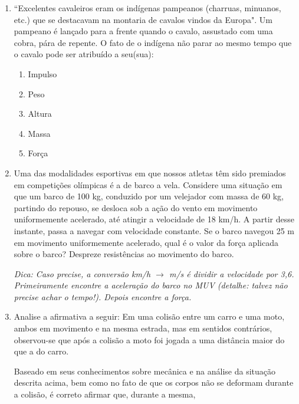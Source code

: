 \documentclass[12pt,letterpaper,fleqn]{article}
\begin{document}
\begin{enumerate}
    \item  “Excelentes cavaleiros eram os indígenas pampeanos (charruas, minuanos, etc.) que se destacavam na montaria de cavalos vindos da Europa". Um pampeano é lançado para a frente quando o cavalo, assustado com uma cobra, pára de repente. O fato de o indígena não parar ao mesmo tempo que o cavalo pode ser atribuído a seu(sua):
    \begin{enumerate}
        \item Impulso
        \item Peso
        \item Altura
        \item Massa
        \item Força
    \end{enumerate}
    
    \item Uma das modalidades esportivas em que nossos atletas têm sido premiados em competições olímpicas é a de barco a vela. Considere uma situação em que um barco de 100 kg, conduzido por um velejador com massa de 60 kg, partindo do repouso, se desloca sob a ação do vento em movimento uniformemente acelerado, até atingir a velocidade de 18 km/h. A partir desse instante, passa a navegar com velocidade constante. Se o barco navegou 25 m em movimento uniformemente acelerado, qual é o valor da força aplicada sobre o barco? Despreze resistências ao movimento do barco.
    
    \textit{Dica: Caso precise, a conversão km/h $\rightarrow$ m/s é dividir a velocidade por 3,6. Primeiramente encontre a aceleração do barco no MUV (detalhe: talvez não precise achar o tempo!). Depois encontre a força.}
    
    \item Analise a afirmativa a seguir: Em uma colisão entre um carro e uma moto, ambos em movimento e na mesma estrada, mas em sentidos contrários, observou-se que após a colisão a moto foi jogada a uma distância maior do que a do carro.

Baseado em seus conhecimentos sobre mecânica e na análise da situação descrita acima, bem como no fato de que os corpos não se deformam durante a colisão, é correto afirmar que, durante a mesma,


\end{enumerate}
\end{document}
